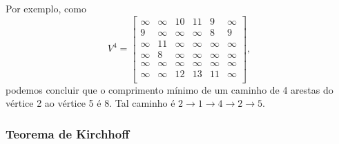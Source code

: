 Por exemplo, como
\[
V^4= \begin{bmatrix}
  \infty & \infty & 10 & 11 & 9 & \infty \\
  9 & \infty & \infty & \infty & 8 & 9 \\
  \infty & 11 & \infty & \infty & \infty & \infty \\
  \infty & 8 & \infty & \infty & \infty & \infty \\
  \infty & \infty & \infty & \infty & \infty & \infty \\
  \infty & \infty & 12 & 13 & 11 & \infty \\
 \end{bmatrix},
\]
podemos concluir que o comprimento mínimo de um caminho
de 4 arestas
do vértice 2 ao vértice 5 é 8.
Tal caminho é
$2 \rightarrow 1 \rightarrow 4 \rightarrow 2 \rightarrow 5$.

\subsubsection{Teorema de Kirchhoff}


